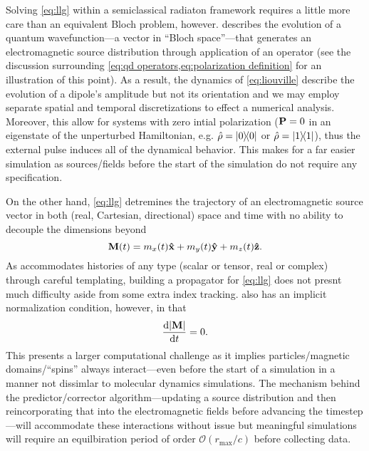 Solving \cref{eq:llg} within a semiclassical radiaton framework requires a little more care than an equivalent Bloch problem, however.
 describes the evolution of a quantum wavefunction---a vector in ``Bloch space''---that generates an electromagnetic source distribution through application of an operator (see the discussion surrounding \cref{eq:qd operators,eq:polarization definition} for an illustration of this point).
As a result, the dynamics of \cref{eq:liouville} describe the evolution of a dipole's amplitude but not its orientation and we may employ separate spatial and temporal discretizations to effect a numerical analysis.
Moreover, this allow for systems with zero intial polarization ($\vb{P} = 0$ in an eigenstate of the unperturbed Hamiltonian, e.g. $\hat{\rho} = \op{0}{0}$ or $\hat{\rho} = \op{1}{1}$), thus the external pulse induces all of the dynamical behavior.
This makes for a far easier simulation as sources/fields before the start of the simulation do not require any specification.

On the other hand, \cref{eq:llg} detremines the trajectory of an electromagnetic source vector in both (real, Cartesian, directional) space and time with no ability to decouple the dimensions beyond
\begin{equation}
  \vb{M}(t) = m_x(t) \vu{x} + m_y(t) \vu{y} + m_z(t) \vu{z}.
\end{equation}
As \QuEST{} accommodates histories of any type (scalar or tensor, real or complex) through careful templating, building a propagator for \cref{eq:llg} does not presnt much difficulty aside from some extra index tracking.
 also has an implicit normalization condition, however, in that
\begin{equation}
  \dv{\abs{\vb{M}}}{t} = 0.
\end{equation}
This presents a larger computational challenge as it implies particles/magnetic domains/``spins'' always interact---even before the start of a simulation in a manner not dissimlar to molecular dynamics simulations.
The mechanism behind the predictor/corrector algorithm---updating a source distribution and then reincorporating that into the electromagnetic fields before advancing the timestep---will accommodate these interactions without issue but meaningful simulations will require an equilbiration period of order $\mathcal{O}(r_\text{max}/c)$ before collecting data.
